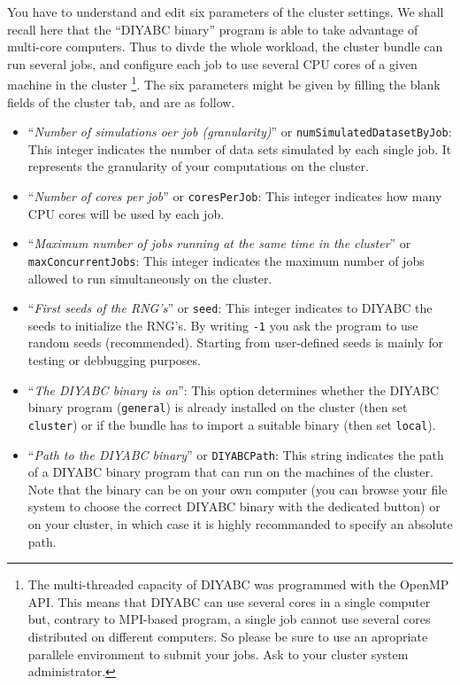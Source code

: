You have to understand and edit six parameters of the cluster settings.
We shall recall here that the ``DIYABC binary'' program is able
to take advantage of multi-core computers. Thus to divde the whole
workload, the cluster bundle can run several jobs, and configure each
job to use several CPU cores of a given machine in the cluster%
\footnote{The multi-threaded capacity of DIYABC was programmed with the OpenMP
API. This means that DIYABC can use several cores in a single computer
but, contrary to MPI-based program, a single job cannot use several
cores distributed on different computers. So please be sure to use
an apropriate parallele environment to submit your jobs. Ask to your
cluster system administrator.%
}. The six parameters might be given by filling the blank fields of
the cluster tab, and are as follow.

\setlength{\itemsep}{0pt} \setlength{\topsep}{0pt} \setlength{\partopsep}{0pt}
\setlength{\parsep}{0pt} \setlength{\parskip}{0pt}
\begin{itemize}
\item ``\textit{Number of simulations oer job (granularity)}'' or \texttt{numSimulatedDatasetByJob}:
This integer indicates the number of data sets simulated by each single
job. It represents the granularity of your computations on the cluster.
\item ``\textit{Number of cores per job}'' or \texttt{coresPerJob}: This
integer indicates how many CPU cores will be used by each job.
\item ``\textit{Maximum number of jobs running at the same time in the
cluster}'' or \texttt{maxConcurrentJobs}: This integer indicates
the maximum number of jobs allowed to run simultaneously on the cluster.
\item ``\textit{First seeds of the RNG's}'' or \texttt{seed}: This integer
indicates to DIYABC the seeds to initialize the RNG's. By writing
\texttt{-1} you ask the program to use random seeds (recommended).
Starting from user-defined seeds is mainly for testing or debbugging
purposes.
\item ``\textit{The DIYABC binary is on}'': This option determines whether
the DIYABC binary program (\texttt{general}) is already installed
on the cluster (then set \texttt{cluster}) or if the bundle has to
import a suitable binary (then set \texttt{local}).
\item ``\textit{Path to the DIYABC binary}'' or \texttt{DIYABCPath}: This
string indicates the path of a DIYABC binary program that can run
on the machines of the cluster. Note that the binary can be on your
own computer (you can browse your file system to choose the correct
DIYABC binary with the dedicated button) or on your cluster, in which
case it is highly recommanded to specify an absolute path.
\end{itemize}

